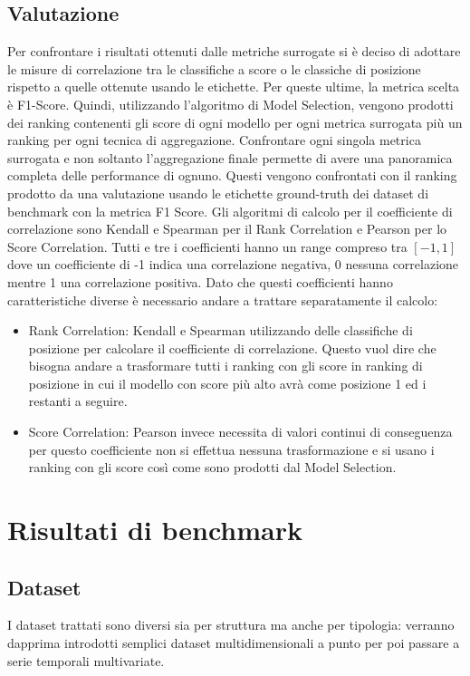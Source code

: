 \subsection{Valutazione}
Per confrontare i risultati ottenuti dalle metriche surrogate si è deciso di adottare le misure di correlazione tra le classifiche a score o le classiche di posizione rispetto a quelle ottenute usando le etichette. Per queste ultime, la metrica scelta è F1-Score.
Quindi, utilizzando l'algoritmo di Model Selection, vengono prodotti dei ranking contenenti gli score di ogni modello per ogni metrica surrogata più un ranking per ogni tecnica di aggregazione. Confrontare ogni singola metrica surrogata e non soltanto l'aggregazione finale permette di avere una panoramica completa delle performance di ognuno.
Questi vengono confrontati con il ranking prodotto da una valutazione usando le etichette ground-truth dei dataset di benchmark con la metrica F1 Score.
Gli algoritmi di calcolo per il coefficiente di correlazione sono Kendall e Spearman per il Rank Correlation e Pearson per lo Score Correlation. Tutti e tre i coefficienti hanno un range compreso tra $[-1,1]$ dove un coefficiente di -1 indica una correlazione negativa, 0 nessuna correlazione mentre 1 una correlazione positiva. 
Dato che questi coefficienti hanno caratteristiche diverse è necessario andare a trattare separatamente il calcolo:
\begin{itemize}
	\item Rank Correlation: Kendall e Spearman utilizzando delle classifiche di posizione per calcolare il coefficiente di correlazione. Questo vuol dire che bisogna andare a trasformare tutti i ranking con gli score in ranking di posizione in cui il modello con score più alto avrà come posizione 1 ed i restanti a seguire.
	\item Score Correlation: Pearson invece necessita di valori continui di conseguenza per questo coefficiente non si effettua nessuna trasformazione e si usano i ranking con gli score così come sono prodotti dal Model Selection.
\end{itemize}

 

\newpage
\section{Risultati di benchmark}
\subsection{Dataset}
I dataset trattati sono diversi sia per struttura ma anche per tipologia: verranno dapprima introdotti semplici dataset multidimensionali a punto per poi passare a serie temporali multivariate. 

